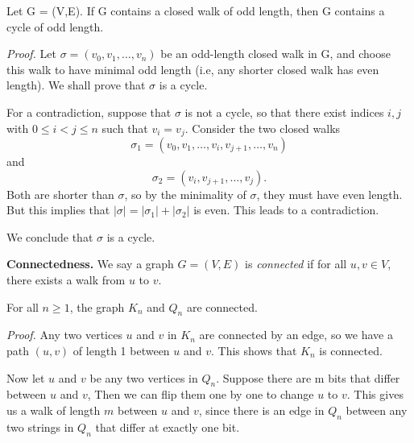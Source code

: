 \documentclass{tufte-handout}
\begin{document}
\begin{Proposition}
    \label{prop:odd_cycle}
    Let G = (V,E). If G contains a closed walk of odd length, then G contains a cycle of odd length.
\end{Proposition}


\textit{Proof.} Let \( \sigma = (v_0, v_1, \ldots, v_n) \) be an odd-length closed walk
in G, and choose this walk to have minimal odd length (i.e, any shorter closed walk has even length).
We shall prove that \( \sigma \) is a cycle.

For a contradiction, suppose that \( \sigma \) is not a cycle, so that there exist indices \( i,j \) with \( 0 \leq i < j \leq n \)
such that \( v_i = v_j \). Consider the two closed walks
\[\sigma_1 = (v_0, v_1, \ldots, v_i, v_{j+1},\ldots , v_{n})\] and
\[\sigma_2 = (v_i, v_{j+1}, \ldots, v_j).\]
Both are shorter than \( \sigma \), so by the minimality of \( \sigma \), they must have even length.
But this implies that \( \left|\sigma\right| = \left|\sigma_1\right| + \left|\sigma_2\right| \) is even.
This leads to a contradiction.

We conclude that \( \sigma \) is a cycle. \qedsymbol

\textbf{Connectedness.} We say a graph \( G = (V,E) \) is \textit{connected} if for all \( u,v \in V \),
there exists a walk from \( u \) to \( v \).

\begin{Proposition}
    For all \( n \geq 1 \), the graph \( K_n \) and \( Q_n \) are connected.
\end{Proposition}

\textit{Proof.} Any two vertices \( u \) and \( v \) in \( K_n \) are connected by an edge, so
we have a path \( (u,v) \) of length 1 between \( u \) and \( v \). This shows that \( K_n \)
is connected.

Now let \( u \) and \( v \) be any two vertices in \( Q_n \). Suppose there are m 
bits that differ between \( u \) and \( v \), Then we can flip them one by one to change \( u \) to \( v \).
This gives us a walk of length \( m \) between \( u \) and \( v \), since there is an
edge in \( Q_n \) between any two strings in \( Q_n \) that differ at exactly one bit. \qedsymbol
\end{document}

